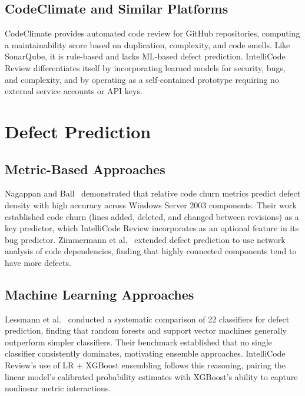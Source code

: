 \documentclass[12pt, oneside]{report}
\begin{document}
\subsection{CodeClimate and Similar Platforms}

CodeClimate provides automated code review for GitHub repositories, computing a
maintainability score based on duplication, complexity, and code smells. Like SonarQube,
it is rule-based and lacks ML-based defect prediction. IntelliCode Review differentiates
itself by incorporating learned models for security, bugs, and complexity, and by operating
as a self-contained prototype requiring no external service accounts or API keys.

\section{Defect Prediction}
\label{sec:rel-defect}

\subsection{Metric-Based Approaches}

Nagappan and Ball~\cite{nagappan2005} demonstrated that relative code churn metrics predict
defect density with high accuracy across Windows Server 2003 components. Their work
established code churn (lines added, deleted, and changed between revisions) as a key
predictor, which IntelliCode Review incorporates as an optional feature in its bug
predictor. Zimmermann et al.~\cite{zimmermann2007} extended defect prediction to use
network analysis of code dependencies, finding that highly connected components tend to
have more defects.

\subsection{Machine Learning Approaches}

Lessmann et al.~\cite{lessmann2008} conducted a systematic comparison of 22 classifiers
for defect prediction, finding that random forests and support vector machines generally
outperform simpler classifiers. Their benchmark established that no single classifier
consistently dominates, motivating ensemble approaches. IntelliCode Review's use of
LR + XGBoost ensembling follows this reasoning, pairing the linear model's calibrated
probability estimates with XGBoost's ability to capture nonlinear metric interactions.
\end{document}

